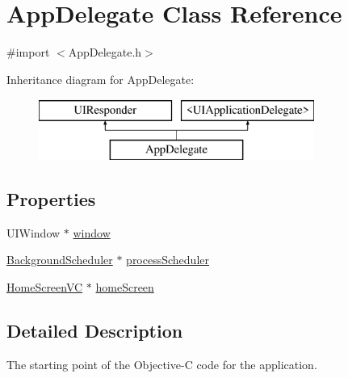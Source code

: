 \hypertarget{interface_app_delegate}{\section{App\-Delegate Class Reference}
\label{interface_app_delegate}
}


{\ttfamily \#import $<$App\-Delegate.\-h$>$}

Inheritance diagram for App\-Delegate\-:\begin{figure}[H]
\begin{center}
\leavevmode
\includegraphics[height=2.000000cm]{interface_app_delegate}
\end{center}
\end{figure}
\subsection*{Properties}
\begin{DoxyCompactItemize}
\item 
U\-I\-Window $\ast$ \hyperlink{interface_app_delegate_acf48ac24125e688cac1a85445cd7fac2}{window}
\item 
\hyperlink{interface_background_scheduler}{Background\-Scheduler} $\ast$ \hyperlink{interface_app_delegate_a7774bb6fd8b636a6d6b15f91f2809a91}{process\-Scheduler}
\item 
\hyperlink{interface_home_screen_v_c}{Home\-Screen\-V\-C} $\ast$ \hyperlink{interface_app_delegate_a22a5a481802e14bae7bd6cbffd141c65}{home\-Screen}
\end{DoxyCompactItemize}


\subsection{Detailed Description}
The starting point of the Objective-\/\-C code for the application. 


